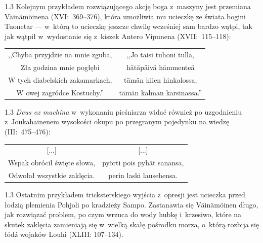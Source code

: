 \documentclass[11pt,a4paper,twoside]{report}
\begin{document}
\newpage
\begin{spacing}{1.3}
Kolejnym przykładem rozwiązującego akcję boga z~maszyny jest przemiana Väinämöinena (XVI:~369--376), która umożliwia mu ucieczkę ze świata bogini Tuonetar --- w~którą to ucieczkę jeszcze chwilę wcześniej sam bardzo wątpi, tak jak wątpił w~wydostanie się z~kiszek Antero Vipunena (XVII:~115--118):
\end{spacing}
{\centering
\small
\begin{longtable}{c c}
,,Chyba przyjdzie na mnie zguba, 		&  ,,Jo taisi tuhoni tulla,\\
Zła godzina mnie pogłębi		&  hätäpäivä hämmenteä\\
W tych diabelskich zakamarkach, 	&  tämän hiien hinkalossa,\\
W owej zagródce Kostuchy.'' 		&  tämän kalman karsinassa.''\\
\end{longtable}
}
\begin{spacing}{1.3}
\emph{Deus ex machina} w~wykonaniu pieśniarza widać również po uzgodnieniu z~Joukahainenem wysokości okupu po przegranym pojedynku na wiedzę (III:~475--476):
\end{spacing}
{\centering
\small
\begin{longtable}{c c}
{[...]} & {[...]}\\
Wspak obrócił święte słowa, 		&  pyörti pois pyhät sanansa,\\
Odwołał wszystkie zaklęcia. 		&  perin laski lausehensa.\\
\end{longtable}
}
\begin{spacing}{1.3}
Ostatnim przykładem tricksterskiego wyjścia z~opresji jest ucieczka przed łodzią plemienia Pohjoli po kradzieży Sampo. Zastanawia się Väinämöinen długo, jak rozwiązać problem, po czym wrzuca do wody hubkę i~krzesiwo, które na skutek zaklęcia zamieniają się w~wielką skałę pośrodku morza, o~którą rozbija się łódź wojaków Louhi (XLIII: 107--134).
\end{spacing}

\vspace*{0.5\baselineskip}
\end{document}
